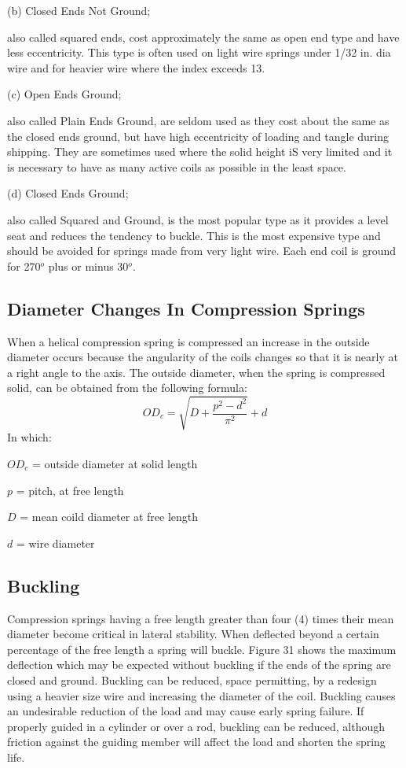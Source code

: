 \documentclass[10pt]{article}
\begin{document}
(b) Closed Ends Not Ground; 

also called squared ends, cost approximately the same as open end type and have less eccentricity.
This type is often used on light wire springs under 1/32 in. dia wire and for heavier wire where the index exceeds 13.

(c) Open Ends Ground; 

also called Plain Ends Ground, are seldom used as they cost about the same as the closed ends ground, but have high eccentricity of loading and tangle during shipping. 
They are sometimes used where the solid height iS very limited and it is necessary to have as many active coils as possible in the least space.

(d) Closed Ends Ground; 

also called Squared and Ground, is the most popular type as it provides a level seat and reduces the tendency to buckle. 
This is the most expensive type and should be avoided for springs made from very light wire. 
Each end coil is ground for 270$^o$ plus or minus 30$^o$.

\subsection{Diameter Changes In Compression Springs} %
When a helical compression spring is compressed an increase in the outside diameter occurs because the angularity of the coils changes so that it is nearly at a right angle to the axis. 
The outside diameter, when the spring is compressed solid, can be obtained from the following formula:
$$ OD_c = \sqrt{D + \frac{p^2 - d^2}{\pi^2}} + d$$
In which:

$OD_c$ = outside diameter at solid length

$p$ = pitch, at free length

$D$ = mean coild diameter at free length

$d$ = wire diameter

\subsection{Buckling} %
Compression springs having a free length greater than four (4) times their mean diameter become critical in lateral stability. 
When deflected beyond a certain percentage of the free length a spring will buckle. 
Figure 31 shows the maximum deflection which may be expected without buckling if the ends of the spring are closed and ground. 
Buckling can be reduced, space permitting, by a redesign using a heavier size wire and increasing the diameter of the coil. Buckling causes an undesirable reduction of the load and may cause early spring failure. 
If properly guided in a cylinder or over a rod, buckling can be reduced, although friction against the guiding member will affect the load and shorten the spring life.
\end{document}
